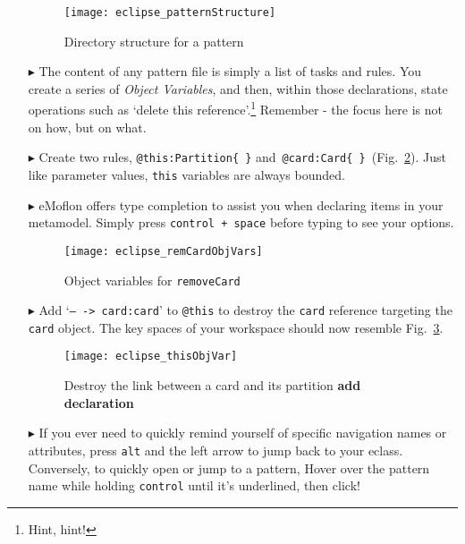 \begin{itemize}
\begin{figure}[htp]
\begin{center}
  \texttt{[image: eclipse\_patternStructure]}
  \caption{Directory structure for a pattern}
  \label{fig:pattStruct}
\end{center}
\end{figure}

\item[$\blacktriangleright$] The content of any pattern file is simply a list of tasks and rules. You create a series of \emph{Object Variables}, and then,
within those declarations, state operations such as `delete this reference'.\footnote{Hint, hint!} Remember - the focus here is not on how, but on what.

\item[$\blacktriangleright$] Create two rules, \texttt{@this:Partition\{ \}} and~\texttt{@card:Card\{ \}}~(Fig.~\ref{fig:remCardObjVar}). Just like parameter
values, \texttt{this} variables are always bounded.

\item[$\blacktriangleright$] eMoflon offers type completion to assist you when declaring items in your metamodel. Simply press \texttt{control + space} before
typing to see your options.

\begin{figure}[htp]
\begin{center}
  \texttt{[image: eclipse\_remCardObjVars]}
  \caption{Object variables for \texttt{removeCard}}
  \label{fig:remCardObjVar}
\end{center}
\end{figure}

\clearpage

\item[$\blacktriangleright$] Add `\texttt{-- -> card:card}' to \texttt{@this} to destroy the \texttt{card} reference targeting the \texttt{card} object. The key
spaces of your workspace should now resemble Fig.~\ref{fig:deleteReference}.

\begin{figure}[htp]
\begin{center}
  \texttt{[image: eclipse\_thisObjVar]}
  \caption{Destroy the link between a card and its partition {\bf add declaration}}
  \label{fig:deleteReference}
\end{center}
\end{figure}

\item[$\blacktriangleright$] If you ever need to quickly remind yourself of specific navigation names or attributes, press \texttt{alt} and the left arrow to
jump back to your eclass. Conversely, to quickly open or jump to a pattern, Hover over the pattern name while holding \texttt{control} until it's underlined, then click!


\end{itemize}
